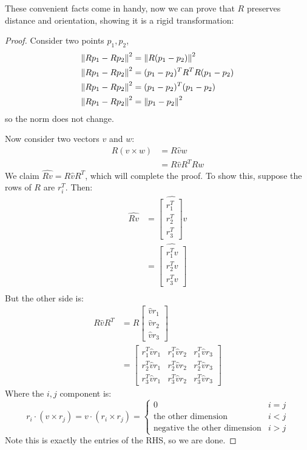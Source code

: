 These convenient facts come in handy, now we can prove that $R$ preserves distance and orientation, showing it is a rigid transformation:
\begin{proof}
    Consider two points $p_1, p_2$,
    \begin{align*}
        \norm{R p_1 - R p_2}^2 &= \norm{R (p_1 - p_2)}^2 \\
        \norm{R p_1 - R p_2}^2 &= (p_1 - p_2)^T R^T R (p_1 - p_2) \\
        \norm{R p_1 - R p_2}^2 &= (p_1 - p_2)^T (p_1 - p_2) \\
        \norm{R p_1 - R p_2}^2 &= \norm{p_1 - p_2}^2 \\
    \end{align*}
    so the norm does not change.

    Now consider two vectors $v$ and $w$:
    \begin{align*}
        R (v \times w) &= R \hat{v} w \\
        &= R \hat{v} R^T Rw 
    \end{align*}
    We claim $\hat{Rv} = R \hat{v} R^T$, which will complete the proof. To show this, suppose the rows of $R$ are $r_i^T$. Then:
    \begin{align*}
        \hat{Rv} &= \hat{\begin{bmatrix}
            r_1^T \\ r_2^T \\ r_3^T
        \end{bmatrix} v} \\
        &= \hat{\begin{bmatrix}
            r_1^T v \\ r_2^T v \\ r_3^T v
        \end{bmatrix}} \\
    \end{align*}
    But the other side is:
    \begin{align*}
        R \hat{v} R^T &= R \begin{bmatrix}
            \hat{v} r_1 \\ \hat{v} r_2 \\ \hat{v} r_3
        \end{bmatrix} \\
        &= \begin{bmatrix}
            r_1^T \hat{v} r_1 & r_1^T \hat{v} r_2 & r_1^T \hat{v} r_3 \\
            r_2^T \hat{v} r_1 & r_2^T \hat{v} r_2 & r_2^T \hat{v} r_3 \\
            r_3^T \hat{v} r_1 & r_3^T \hat{v} r_2 & r_3^T \hat{v} r_3
        \end{bmatrix}
    \end{align*}
    Where the $i, j$ component is:
    \[ r_i \cdot (v \times r_j) = v \cdot (r_i \times r_j) = \begin{cases}
        0 & i = j \\
        \text{the other dimension} & i < j \\
        \text{negative the other dimension} & i > j
    \end{cases}\]
    Note this is exactly the entries of the RHS, so we are done.
\end{proof}